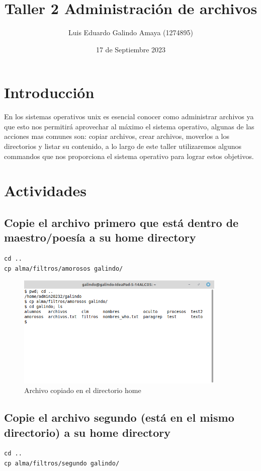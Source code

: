 \documentclass[11pt]{article}
\author{Luis Eduardo Galindo Amaya (1274895)}
\date{17 de Septiembre 2023}
\title{Taller 2 Administración de archivos}
\begin{document}
\tableofcontents\pagebreak
{}


\section{Introducción}
\label{sec:org2348f37}
En los sistemas operativos unix es esencial conocer como administrar archivos 
ya que esto nos permitirá aprovechar al máximo el sistema operativo, algunas 
de las acciones mas comunes son: copiar archivos, crear archivos, moverlos a 
los directorios y listar su contenido, a lo largo de este taller utilizaremos 
algunos commandos que nos proporciona el sistema operativo para lograr estos 
objetivos.

\pagebreak

\section{Actividades}
\label{sec:org8bd98df}
\subsection{Copie el archivo primero que está dentro de maestro/poesía a su home directory}
\label{sec:org52719f8}
\begin{verbatim}
cd ..
cp alma/filtros/amorosos galindo/
\end{verbatim}

\begin{figure}[htbp]
\centering
\includegraphics[width=10cm]{img/a1.png}
\caption{Archivo copiado en el directorio home}
\end{figure}

\subsection{Copie el archivo segundo (está en el mismo directorio) a su home directory}
\label{sec:orga0cfbd8}
\begin{verbatim}
cd .. 
cp alma/filtros/segundo galindo/
\end{verbatim}
\end{document}
